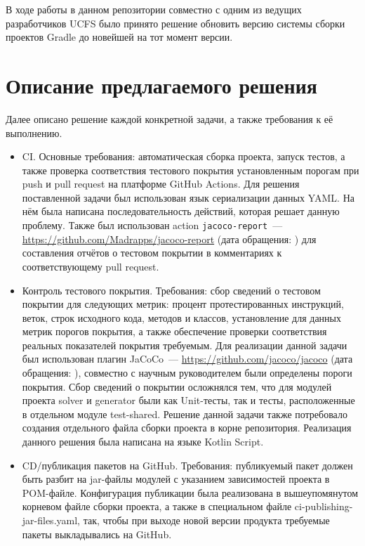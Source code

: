 \documentclass[a4paper]{article}
\begin{document}
В ходе работы в данном репозитории совместно с одним из ведущих разработчиков UCFS было принято решение обновить версию системы сборки проектов Gradle до новейшей на тот момент версии.


\section{Описание предлагаемого решения}


Далее описано решение каждой конкретной задачи, а также требования к её выполнению.
\begin{itemize}
    \item CI. Основные требования: автоматическая сборка проекта, запуск тестов, а также проверка соответствия тестового покрытия установленным порогам при push и pull request на платформе GitHub Actions. Для решения поставленной задачи был использован язык сериализации данных YAML. На нём была написана последовательность действий, которая решает данную проблему. Также был использован action \verb|jacoco-report|~--- \url{https://github.com/Madrapps/jacoco-report} (дата обращения: ) для составления отчётов о тестовом покрытии в комментариях к соответствующему pull request.
    \item Контроль тестового покрытия. Требования: сбор сведений о тестовом покрытии для следующих метрик: процент протестированных инструкций, веток, строк исходного кода, методов и классов, установление для данных метрик порогов покрытия, а также обеспечение проверки соответствия реальных показателей покрытия требуемым. Для реализации данной задачи был использован плагин JaCoCo~--- \url{https://github.com/jacoco/jacoco} (дата обращения: ), совместно с научным руководителем были определены пороги покрытия. Сбор сведений о покрытии осложнялся тем, что для модулей проекта solver и generator были как Unit-тесты, так и тесты, расположенные в отдельном модуле test-shared. Решение данной задачи также потребовало создания отдельного файла сборки проекта в корне репозитория. Реализация данного решения была написана на языке Kotlin Script.
    \item CD/публикация пакетов на GitHub. Требования: публикуемый пакет должен быть разбит на jar-файлы модулей с указанием зависимостей проекта в POM-файле. Конфигурация публикации была реализована в вышеупомянутом корневом файле сборки проекта, а также в специальном файле ci-publishing-jar-files.yaml, так, чтобы при выходе новой версии продукта требуемые пакеты выкладывались на GitHub.
\end{itemize}
\end{document}
